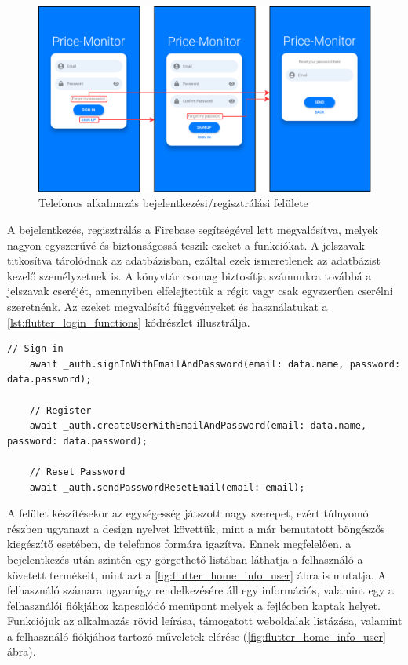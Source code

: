\begin{figure}[H]
    \centering
    \includegraphics[scale=1]{figures/images/flutter_login.png}
    \caption{Telefonos alkalmazás bejelentkezési/regisztrálási felülete}
    \label{fig:flutter_login_reg}
\end{figure}

A bejelentkezés, regisztrálás a Firebase segítségével lett megvalósítva, melyek nagyon egyszerűvé és biztonságossá teszik ezeket a funkciókat. A jelszavak titkosítva tárolódnak az adatbázisban, ezáltal ezek ismeretlenek az adatbázist kezelő személyzetnek is. A könyvtár csomag biztosítja számunkra továbbá a jelszavak cseréjét, amennyiben elfelejtettük a régit vagy csak egyszerűen cserélni szeretnénk. Az ezeket megvalósító függvényeket és használatukat a \ref{lst:flutter_login_functions} kódrészlet illusztrálja.

\begin{lstlisting}[caption={Bejelentkező/regisztráló/jelszó csere funkciót megvalósító függvények}, label={lst:flutter_login_functions}, basicstyle=\footnotesize]
    // Sign in
    await _auth.signInWithEmailAndPassword(email: data.name, password: data.password);

    // Register
    await _auth.createUserWithEmailAndPassword(email: data.name, password: data.password);

    // Reset Password
    await _auth.sendPasswordResetEmail(email: email);
\end{lstlisting}

A felület készítésekor az egységesség játszott nagy szerepet, ezért túlnyomó részben ugyanazt a design nyelvet követtük, mint a már bemutatott böngészős kiegészítő esetében, de telefonos formára igazítva. Ennek megfelelően, a bejelentkezés után szintén egy görgethető listában láthatja a felhasználó a követett termékeit, mint azt a \ref{fig:flutter_home_info_user} ábra is mutatja. A felhasználó számara ugyanúgy rendelkezésére áll egy információs, valamint egy a felhasználói fiókjához kapcsolódó menüpont melyek a fejlécben kaptak helyet. Funkciójuk az alkalmazás rövid leírása, támogatott weboldalak listázása, valamint a felhasználó fiókjához tartozó műveletek elérése (\ref{fig:flutter_home_info_user} ábra).

